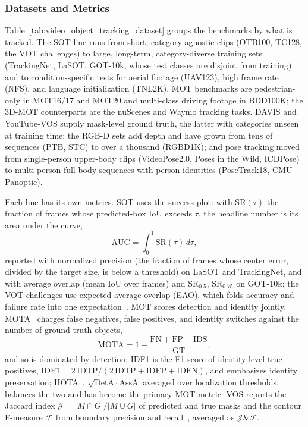 \subsubsection{Datasets and Metrics}

Table~\ref{tab:video_object_tracking_dataset} groups the benchmarks by what is tracked. The SOT line runs from short, category-agnostic clips (OTB100, TC128, the VOT challenges) to large, long-term, category-diverse training sets (TrackingNet, LaSOT, GOT-10k, whose test classes are disjoint from training) and to condition-specific tests for aerial footage (UAV123), high frame rate (NFS), and language initialization (TNL2K). MOT benchmarks are pedestrian-only in MOT16/17 and MOT20 and multi-class driving footage in BDD100K; the 3D-MOT counterparts are the nuScenes and Waymo tracking tasks. DAVIS and YouTube-VOS supply mask-level ground truth, the latter with categories unseen at training time; the RGB-D sets add depth and have grown from tens of sequences (PTB, STC) to over a thousand (RGBD1K); and pose tracking moved from single-person upper-body clips (VideoPose2.0, Poses in the Wild, ICDPose) to multi-person full-body sequences with person identities (PoseTrack18, CMU Panoptic).

Each line has its own metrics. SOT uses the success plot: with $\mathrm{SR}(\tau)$ the fraction of frames whose predicted-box IoU exceeds $\tau$, the headline number is its area under the curve,
\begin{equation}
    \mathrm{AUC} = \int_0^1 \mathrm{SR}(\tau)\, d\tau ,
\end{equation}
reported with normalized precision (the fraction of frames whose center error, divided by the target size, is below a threshold) on LaSOT and TrackingNet, and with average overlap (mean IoU over frames) and $\mathrm{SR}_{0.5}$, $\mathrm{SR}_{0.75}$ on GOT-10k; the VOT challenges use expected average overlap (EAO), which folds accuracy and failure rate into one expectation~\cite{roffo2016visual}. MOT scores detection and identity jointly. MOTA~\cite{bernardin2008evaluating} charges false negatives, false positives, and identity switches against the number of ground-truth objects,
\begin{equation}
    \mathrm{MOTA} = 1 - \frac{\mathrm{FN}+\mathrm{FP}+\mathrm{IDS}}{\mathrm{GT}} ,
\end{equation}
and so is dominated by detection; IDF1 is the F1 score of identity-level true positives, $\mathrm{IDF1} = 2\,\mathrm{IDTP} / (2\,\mathrm{IDTP} + \mathrm{IDFP} + \mathrm{IDFN})$, and emphasizes identity preservation; HOTA~\cite{luiten2021hota}, $\sqrt{\mathrm{DetA}\cdot\mathrm{AssA}}$ averaged over localization thresholds, balances the two and has become the primary MOT metric. VOS reports the Jaccard index $\mathcal{J} = |M \cap G| / |M \cup G|$ of predicted and true masks and the contour F-measure $\mathcal{F}$ from boundary precision and recall~\cite{perazzi2016benchmark}, averaged as $\mathcal{J}\&\mathcal{F}$.

